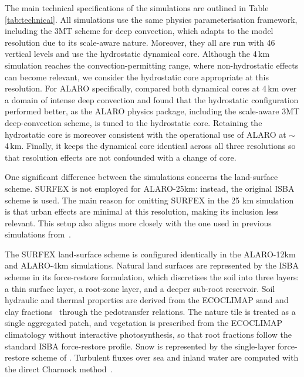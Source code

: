 \documentclass[journal abbreviation, manuscript]{copernicus}
\begin{document}
The main technical specifications of the simulations are outlined in Table \ref{tab:technical}. 
All simulations use the same physics parameterisation framework, including the 3MT scheme for deep convection, which adapts to the model resolution due to its scale-aware nature.
Moreover, they all are run with 46 vertical levels and use the hydrostatic dynamical core.
Although the 4\,km simulation reaches the convection-permitting range, where non-hydrostatic effects can become relevant, we consider the hydrostatic core appropriate at this resolution.
For ALARO specifically, \citet{vanginderachterSimulatingModelUncertainty2020} compared both dynamical cores at 4\,km over a domain of intense deep convection and found that the hydrostatic configuration performed better, as the ALARO physics package, including the scale-aware 3MT deep-convection scheme, is tuned to the hydrostatic core.
Retaining the hydrostatic core is moreover consistent with the operational use of ALARO at $\sim$4\,km.
Finally, it keeps the dynamical core identical across all three resolutions so that resolution effects are not confounded with a change of core.

One significant difference between the simulations concerns the land-surface scheme. 
SURFEX is not employed for ALARO-25km: instead, the original ISBA scheme is used. 
The main reason for omitting SURFEX in the 25 km simulation is that urban effects are minimal at this resolution, making its inclusion less relevant. 
This setup also aligns more closely with the one used in previous simulations from~\citet{giot_validation_2016}.

The SURFEX land-surface scheme is configured identically in the ALARO-12km and ALARO-4km simulations.
Natural land surfaces are represented by the ISBA scheme in its force-restore formulation, which discretises the soil into three layers: a thin surface layer, a root-zone layer, and a deeper sub-root reservoir.
Soil hydraulic and thermal properties are derived from the ECOCLIMAP sand and clay fractions~\citep{massonGlobalDatabaseLand2003} through the \citet{clappEmpiricalEquationsSoil1978} pedotransfer relations.
The nature tile is treated as a single aggregated patch, and vegetation is prescribed from the ECOCLIMAP climatology without interactive photosynthesis, so that root fractions follow the standard ISBA force-restore profile.
Snow is represented by the single-layer force-restore scheme of \citet{douvilleNewSnowParameterization1995}.
Turbulent fluxes over sea and inland water are computed with the direct Charnock method~\citep{charnockWindStressWater1955}.
\end{document}
